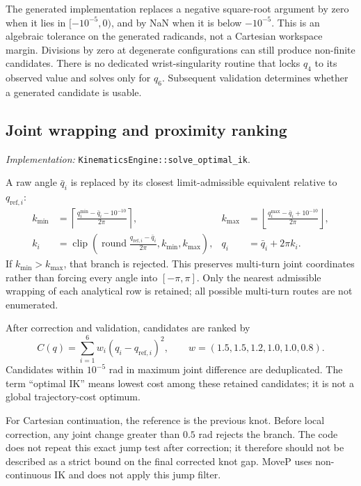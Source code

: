 \documentclass[11pt,a4paper]{report}
\newcommand{\file}[1]{\nolinkurl{#1}}
\newcommand{\src}[1]{\textit{Implementation:} \file{#1}.}
\newcommand{\clip}{\operatorname{clip}}
\begin{document}
The generated implementation replaces a negative square-root argument by
zero when it lies in $[-10^{-5},0)$, and by NaN when it is below $-10^{-5}$.
This is an algebraic tolerance on the generated radicands, not a Cartesian
workspace margin. Divisions by zero at degenerate configurations can still
produce non-finite candidates. There is no dedicated wrist-singularity
routine that locks $q_4$ to its observed value and solves only for $q_6$.
Subsequent validation determines whether a generated candidate is usable.

\subsection{Joint wrapping and proximity ranking}
\src{KinematicsEngine::solve_optimal_ik}

A raw angle $\bar q_i$ is replaced by its closest limit-admissible equivalent
relative to $q_{\mathrm{ref},i}$:
\begin{align}
 k_{\min}&=\left\lceil\frac{q_i^{\min}-\bar q_i-10^{-10}}{2\pi}\right\rceil,
 &k_{\max}&=\left\lfloor\frac{q_i^{\max}-\bar q_i+10^{-10}}{2\pi}\right\rfloor,\\
 k_i&=\clip\!\left(\operatorname{round}\frac{q_{\mathrm{ref},i}-\bar q_i}{2\pi},
 k_{\min},k_{\max}\right),
 &q_i&=\bar q_i+2\pi k_i.
\end{align}
If $k_{\min}>k_{\max}$, that branch is rejected. This preserves multi-turn
joint coordinates rather than forcing every angle into $[-\pi,\pi]$.
Only the nearest admissible wrapping of each analytical row is retained;
all possible multi-turn routes are not enumerated.

After correction and validation, candidates are ranked by
\begin{equation}
 C(q)=\sum_{i=1}^{6}w_i(q_i-q_{\mathrm{ref},i})^2,\qquad
 w=(1.5,1.5,1.2,1.0,1.0,0.8).
 \label{eq:ikcost}
\end{equation}
Candidates within $10^{-5}$ rad in maximum joint difference are deduplicated.
The term ``optimal IK'' means lowest cost among these retained candidates;
it is not a global trajectory-cost optimum.

For Cartesian continuation, the reference is the previous knot. Before local
correction, any joint change greater than $0.5$ rad rejects the branch.
The code does not repeat this exact jump test after correction; it therefore
should not be described as a strict bound on the final corrected knot gap.
MoveP uses non-continuous IK and does not apply this jump filter.
\end{document}
